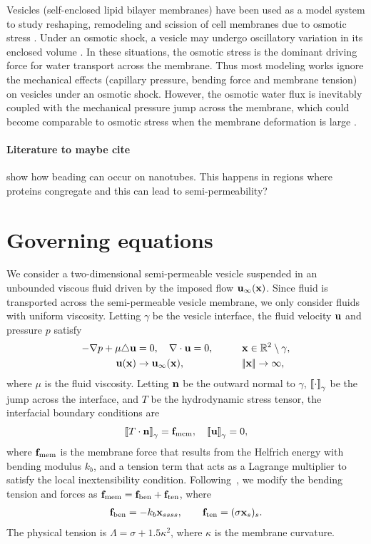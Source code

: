\documentclass[9pt,twocolumn,twoside,lineno]{pnas-new}
\begin{document}
Vesicles (self-enclosed lipid bilayer membranes) have been used as a model system to study reshaping, remodeling and scission of cell membranes due to osmotic stress \cite{OgleckaEtAl2014_eLife,CamposSaric2020_bioRxiv,Dimova2020_GVB}. Under an osmotic shock, a vesicle may undergo oscillatory variation in its enclosed volume \cite{ChabanonHoLiedberg2017_BJ}. In these situations, the osmotic stress is the dominant driving force for water transport across the membrane. Thus most modeling works ignore the mechanical effects (capillary pressure, bending force and membrane tension) on vesicles under an osmotic shock. However, the osmotic water flux is inevitably coupled with the mechanical pressure jump across the membrane\cite{yao-mor2017}, which could become comparable to osmotic stress when the membrane deformation is large \cite{LiMoriSun2015_PRL,yao-mor2017}.


\paragraph{Literature to maybe cite}
\cite{ali-ovr-ran2020} show how beading can occur on nanotubes. This
happens in regions where proteins congregate and this can lead to
semi-permeability?

\section*{Governing equations \label{sc:formulate}}
We consider a two-dimensional semi-permeable vesicle suspended in an
unbounded viscous fluid driven by the imposed flow $\mathbf{u}_\infty(\mathbf{x})$.
Since fluid is transported across the semi-permeable vesicle membrane,
we only consider fluids with uniform viscosity. Letting $\gamma$ be the
vesicle interface, the fluid velocity $\mathbf{u}$ and pressure $p$ satisfy
%
\begin{alignat}{3}
  \label{eqn:governing}
  -\nabla p + \mu \triangle \uu &= 0, \quad
  \nabla \cdot \uu = 0, \qquad &&\xx \in \RR^2 \setminus \gamma, \\
%
  \uu(\xx) &\rightarrow \uu_\infty(\xx),
    &&\norm{\xx} \rightarrow \infty,
\end{alignat}
where $\mu$ is the fluid viscosity. Letting $\mathbf{n}$ be the outward normal
to $\gamma$, $\left[\!\left[ \cdot \right]\!\right]_\gamma$ be the jump across the interface, and $T$ be
the hydrodynamic stress tensor, the interfacial boundary conditions are
\begin{align}
  \label{eqn:jump}
  \left[\!\left[ T\cdot\mathbf{n} \right]\!\right]_\gamma = \mathbf{f}_\mathrm{mem}, \quad \left[\!\left[ \mathbf{u} \right]\!\right]_\gamma = 0,
\end{align}
where $\mathbf{f}_\mathrm{mem}$ is the membrane force that results from the
Helfrich energy with bending modulus $k_b$, and a tension term that acts
as a Lagrange multiplier to satisfy the local inextensibility condition.
Following~\cite{vee-gue-zor-bir2009}, we modify the bending tension and
forces as
$\mathbf{f}_\mathrm{mem} = \mathbf{f}_\mathrm{ben} +
\mathbf{f}_\mathrm{ten}$, where
\begin{align}
  \label{eqn:membraneForces}
  \mathbf{f}_\mathrm{ben} = -k_b \mathbf{x}_{ssss}, \qquad
  \mathbf{f}_\mathrm{ten} = (\sigma \mathbf{x}_s)_s.
\end{align}
The physical tension is $\Lambda = \sigma + 1.5 \kappa^2$, where
$\kappa$ is the membrane curvature.
\end{document}
